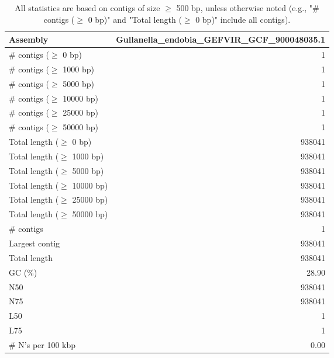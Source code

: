\documentclass[12pt,a4paper]{article}
\begin{document}
\begin{table}[ht]
\begin{center}
\caption{All statistics are based on contigs of size $\geq$ 500 bp, unless otherwise noted (e.g., "\# contigs ($\geq$ 0 bp)" and "Total length ($\geq$ 0 bp)" include all contigs).}
\begin{tabular}{|l*{1}{|r}|}
\hline
Assembly & Gullanella\_endobia\_GEFVIR\_GCF\_900048035.1 \\ \hline
\# contigs ($\geq$ 0 bp) & 1 \\ \hline
\# contigs ($\geq$ 1000 bp) & 1 \\ \hline
\# contigs ($\geq$ 5000 bp) & 1 \\ \hline
\# contigs ($\geq$ 10000 bp) & 1 \\ \hline
\# contigs ($\geq$ 25000 bp) & 1 \\ \hline
\# contigs ($\geq$ 50000 bp) & 1 \\ \hline
Total length ($\geq$ 0 bp) & 938041 \\ \hline
Total length ($\geq$ 1000 bp) & 938041 \\ \hline
Total length ($\geq$ 5000 bp) & 938041 \\ \hline
Total length ($\geq$ 10000 bp) & 938041 \\ \hline
Total length ($\geq$ 25000 bp) & 938041 \\ \hline
Total length ($\geq$ 50000 bp) & 938041 \\ \hline
\# contigs & 1 \\ \hline
Largest contig & 938041 \\ \hline
Total length & 938041 \\ \hline
GC (\%) & 28.90 \\ \hline
N50 & 938041 \\ \hline
N75 & 938041 \\ \hline
L50 & 1 \\ \hline
L75 & 1 \\ \hline
\# N's per 100 kbp & 0.00 \\ \hline
\end{tabular}
\end{center}
\end{table}
\end{document}
